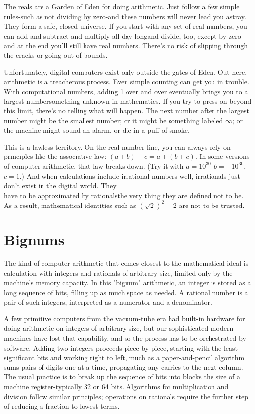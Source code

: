 \documentclass[10pt]{article}
\begin{document}
The reals are a Garden of Eden for doing arithmetic. Just follow a few simple rules-such as not dividing by zero-and these numbers will never lead you astray. They form a safe, closed universe. If you start with any set of real numbers, you can add and subtract and multiply all day longand divide, too, except by zero-and at the end you'll still have real numbers. There's no risk of slipping through the cracks or going out of bounds.

Unfortunately, digital computers exist only outside the gates of Eden. Out here, arithmetic is a treacherous process. Even simple counting can get you in trouble. With computational numbers, adding 1 over and over eventually brings you to a largest numbersomething unknown in mathematics. If you try to press on beyond this limit, there's no telling what will happen. The next number after the largest number might be the smallest number; or it might be something labeled $\infty$; or the machine might sound an alarm, or die in a puff of smoke.

This is a lawless territory. On the real number line, you can always rely on principles like the associative law: $(a+b)+c=a+(b+c)$. In some versions of computer arithmetic, that law breaks down. (Try it with $a=10^{30}, b=-10^{30}$, $c=1$.) And when calculations include irrational numbers-well, irrationals just don't exist in the digital world. They\\
have to be approximated by rationalsthe very thing they are defined not to be. As a result, mathematical identities such as $(\sqrt{2})^{2}=2$ are not to be trusted.

\section*{Bignums}
The kind of computer arithmetic that comes closest to the mathematical ideal is calculation with integers and rationals of arbitrary size, limited only by the machine's memory capacity. In this "bignum" arithmetic, an integer is stored as a long sequence of bits, filling up as much space as needed. A rational number is a pair of such integers, interpreted as a numerator and a denominator.

A few primitive computers from the vacuum-tube era had built-in hardware for doing arithmetic on integers of arbitrary size, but our sophisticated modern machines have lost that capability, and so the process has to be orchestrated by software. Adding two integers proceeds piece by piece, starting with the least-significant bits and working right to left, much as a paper-and-pencil algorithm sums pairs of digits one at a time, propagating any carries to the next column. The usual practice is to break up the sequence of bits into blocks the size of a machine register-typically 32 or 64 bits. Algorithms for multiplication and division follow similar principles; operations on rationals require the further step of reducing a fraction to lowest terms.
\end{document}
